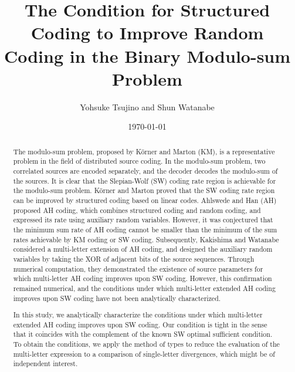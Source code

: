 \documentclass[journal,onecolumn]{IEEEtran}
\title{The Condition for Structured Coding to Improve Random Coding in the Binary Modulo-sum Problem}
\author{Yohsuke Tsujino and Shun Watanabe}
\date{\today}
\theoremstyle{definition}
\theoremstyle{remark}
\begin{document}
\maketitle
\begin{abstract}
The modulo-sum problem, proposed by Körner and Marton (KM), is a representative problem in the field of distributed source coding.
In the modulo-sum problem, two correlated sources are encoded separately, and the decoder decodes the modulo-sum of the sources.
It is clear that the Slepian-Wolf (SW) coding rate region is achievable for the modulo-sum problem.
Körner and Marton proved that the SW coding rate region can be improved by structured coding based on linear codes.
Ahlswede and Han (AH) proposed AH coding, which combines structured coding and random coding, and expressed its rate using auxiliary random variables.
However, it was conjectured that the minimum sum rate of AH coding cannot be smaller than the minimum of the sum rates achievable by KM coding or SW coding.
Subsequently, Kakishima and Watanabe considered a multi-letter extension of AH coding, and designed the auxiliary random variables by taking the XOR of adjacent bits of the source sequences.
Through numerical computation, they demonstrated the existence of source parameters for which multi-letter AH coding improves upon SW coding.
However, this confirmation remained numerical, and the conditions under which multi-letter extended AH coding improves upon SW coding have not been analytically characterized.

In this study, we analytically characterize the conditions under which multi-letter extended AH coding improves upon SW coding.
Our condition is tight in the sense that it coincides with the complement of the known SW optimal sufficient condition.
To obtain the conditions, we apply the method of types to reduce the evaluation of the multi-letter expression to a comparison of single-letter divergences, which might be of independent interest.

\end{abstract}
\end{document}
